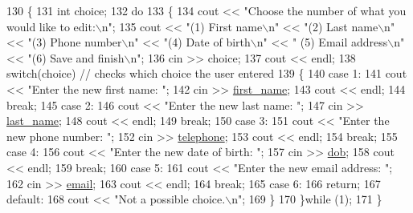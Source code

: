 \begin{DoxyCode}
130 \{
131    \textcolor{keywordtype}{int} choice;
132    \textcolor{keywordflow}{do}
133    \{
134       cout << \textcolor{stringliteral}{"Choose the number of what you would like to edit:\(\backslash\)n"};
135       cout << \textcolor{stringliteral}{"(1) First name\(\backslash\)n"} << \textcolor{stringliteral}{"(2) Last name\(\backslash\)n"} << \textcolor{stringliteral}{"(3) Phone number\(\backslash\)n"} << \textcolor{stringliteral}{"(4) Date of birth\(\backslash\)n"} << \textcolor{stringliteral}{"
      (5) Email address\(\backslash\)n"} << \textcolor{stringliteral}{"(6) Save and finish\(\backslash\)n"};
136       cin >> choice;
137       cout << endl;
138       \textcolor{keywordflow}{switch}(choice) \textcolor{comment}{// checks which choice the user entered                                               
                                                                                                       }
139       \{
140         \textcolor{keywordflow}{case} 1:
141             cout << \textcolor{stringliteral}{"Enter the new first name: "};
142             cin >> \hyperlink{classContact_ac074ba210aa0e4a52921af8353384a59}{first\_name};
143             cout << endl;
144             \textcolor{keywordflow}{break};
145          \textcolor{keywordflow}{case} 2:
146             cout << \textcolor{stringliteral}{"Enter the new last name: "};
147             cin >> \hyperlink{classContact_a87032ae00ab0e8cc81d660f191bcf0fa}{last\_name};
148             cout << endl;
149             \textcolor{keywordflow}{break};
150          \textcolor{keywordflow}{case} 3:
151             cout << \textcolor{stringliteral}{"Enter the new phone number: "};
152             cin >> \hyperlink{classContact_ad23a96ecf0527e8878da50da682ba794}{telephone};
153             cout << endl;
154             \textcolor{keywordflow}{break};
155          \textcolor{keywordflow}{case} 4:
156             cout << \textcolor{stringliteral}{"Enter the new date of birth: "};
157             cin >> \hyperlink{classContact_a50397132da5dc66f2cb289fc650c3df6}{dob};
158             cout << endl;
159             \textcolor{keywordflow}{break};
160          \textcolor{keywordflow}{case} 5:
161             cout << \textcolor{stringliteral}{"Enter the new email address: "};
162             cin >> \hyperlink{classContact_a7cb8a0ab45d0ddc7a83df39590fcb6c1}{email};
163             cout << endl;
164             \textcolor{keywordflow}{break};
165          \textcolor{keywordflow}{case} 6:
166             \textcolor{keywordflow}{return};
167          \textcolor{keywordflow}{default}:
168             cout << \textcolor{stringliteral}{"Not a possible choice.\(\backslash\)n"};
169       \}
170    \}\textcolor{keywordflow}{while} (1);
171 \}
\end{DoxyCode}


